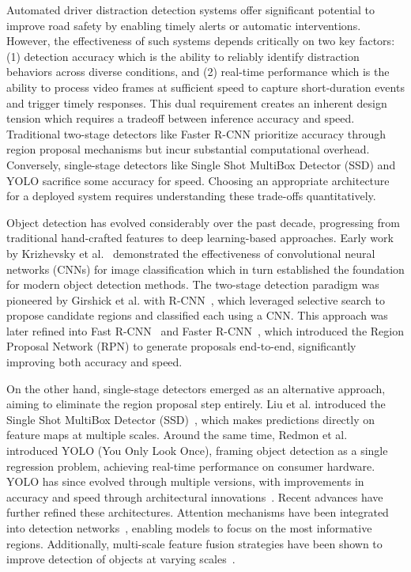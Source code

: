 \documentclass[conference]{IEEEtran}
\begin{document}

Automated driver distraction detection systems offer significant potential to improve road safety by enabling timely alerts or automatic interventions. However, the effectiveness of such systems depends critically on two key factors: (1) detection accuracy which is the ability to reliably identify distraction behaviors across diverse conditions, and (2) real-time performance which is the ability to process video frames at sufficient speed to capture short-duration events and trigger timely responses. This dual requirement creates an inherent design tension which requires a tradeoff between inference accuracy and speed. Traditional two-stage detectors like Faster R-CNN prioritize accuracy through region proposal mechanisms but incur substantial computational overhead. Conversely, single-stage detectors like Single Shot MultiBox Detector (SSD) and YOLO sacrifice some accuracy for speed. Choosing an appropriate architecture for a deployed system requires understanding these trade-offs quantitatively.


Object detection has evolved considerably over the past decade, progressing from traditional hand-crafted features to deep learning-based approaches. Early work by Krizhevsky et al.~\cite{krizhevsky2012} demonstrated the effectiveness of convolutional neural networks (CNNs) for image classification which in turn established the foundation for modern object detection methods. The two-stage detection paradigm was pioneered by Girshick et al. with R-CNN~\cite{girshick2014}, which leveraged selective search to propose candidate regions and classified each using a CNN. This approach was later refined into Fast R-CNN~\cite{girshick2015} and Faster R-CNN~\cite{ren2015}, which introduced the Region Proposal Network (RPN) to generate proposals end-to-end, significantly improving both accuracy and speed.

On the other hand, single-stage detectors emerged as an alternative approach, aiming to eliminate the region proposal step entirely. Liu et al. introduced the Single Shot MultiBox Detector (SSD)~\cite{liu2016}, which makes predictions directly on feature maps at multiple scales. Around the same time, Redmon et al.~\cite{redmon2016} introduced YOLO (You Only Look Once), framing object detection as a single regression problem, achieving real-time performance on consumer hardware. YOLO has since evolved through multiple versions, with improvements in accuracy and speed through architectural innovations~\cite{redmon2017,bochkovskiy2020}. Recent advances have further refined these architectures. Attention mechanisms have been integrated into detection networks~\cite{wang2020}, enabling models to focus on the most informative regions. Additionally, multi-scale feature fusion strategies have been shown to improve detection of objects at varying scales~\cite{lin2017}.
\end{document}

